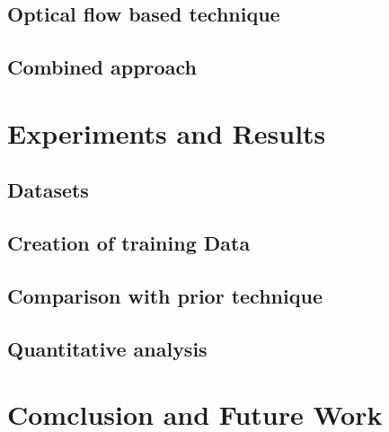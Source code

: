 \documentclass[times,10pt,twocolumn,a4paper]{article}
\begin{document}
\cite{Chapelle99}

\subsection{Optical flow based technique}
\cite{Liu11Thesis}

\cite{Liu11} 
\subsection{Combined approach}

\section{Experiments and Results}
\subsection{Datasets}
\subsection{Creation of training Data}
\subsection{Comparison with prior technique}
\subsection{Quantitative analysis}
\section{Comclusion and Future Work}



\end{document}
